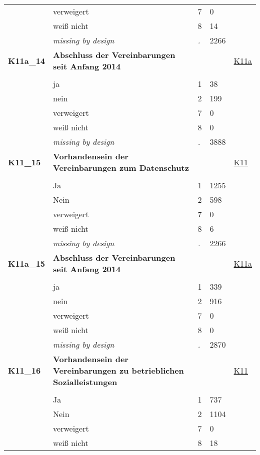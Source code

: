 \begin{longtable}{| L{2.65cm} | L{8cm} | C{1.5cm} | R{1.25cm} | C{2.25cm}  |}
   & verweigert & 7 & 0 &  \\ 
   & weiß nicht & 8 & 14 &  \\ 
   & \textit{missing by design} & \textit{.} & 2266 &  \\ 
   \midrule
\textbf{K11a\_14}\label{var:K11a:14} & \textbf{Abschluss der Vereinbarungen seit Anfang 2014} &  &  & \hyperref[K11a]{K11a} \\ 
   &  &  &  &  \\ 
   & ja & 1 & 38 &  \\ 
   & nein & 2 & 199 &  \\ 
   & verweigert & 7 & 0 &  \\ 
   & weiß nicht & 8 & 0 &  \\ 
   & \textit{missing by design} & \textit{.} & 3888 &  \\ 
   \midrule
\textbf{K11\_15}\label{var:K11:15} & \textbf{Vorhandensein der Vereinbarungen zum Datenschutz} &  &  & \hyperref[K11]{K11} \\ 
   &  &  &  &  \\ 
   & Ja & 1 & 1255 &  \\ 
   & Nein & 2 & 598 &  \\ 
   & verweigert & 7 & 0 &  \\ 
   & weiß nicht & 8 & 6 &  \\ 
   & \textit{missing by design} & \textit{.} & 2266 &  \\ 
   \midrule
\textbf{K11a\_15}\label{var:K11a:15} & \textbf{Abschluss der Vereinbarungen seit Anfang 2014} &  &  & \hyperref[K11a]{K11a} \\ 
   &  &  &  &  \\ 
   & ja & 1 & 339 &  \\ 
   & nein & 2 & 916 &  \\ 
   & verweigert & 7 & 0 &  \\ 
   & weiß nicht & 8 & 0 &  \\ 
   & \textit{missing by design} & \textit{.} & 2870 &  \\ 
   \midrule
\textbf{K11\_16}\label{var:K11:16} & \textbf{Vorhandensein der Vereinbarungen zu betrieblichen Sozialleistungen} &  &  & \hyperref[K11]{K11} \\ 
   &  &  &  &  \\ 
   & Ja & 1 & 737 &  \\ 
   & Nein & 2 & 1104 &  \\ 
   & verweigert & 7 & 0 &  \\ 
   & weiß nicht & 8 & 18 &  \\ 

\end{longtable}
